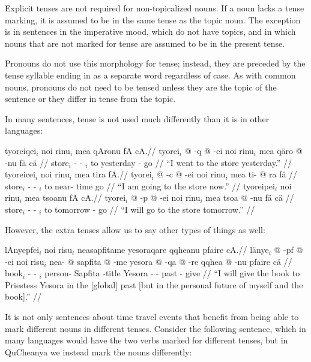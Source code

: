 \documentclass{article}
\begin{document}
Explicit tenses are not required for non-topicalized nouns.  If a noun lacks a tense marking, it is assumed to be in the same tense as the topic noun.  The exception is in sentences in the imperative mood, which do not have topics, and in which nouns that are not marked for tense are assumed to be in the present tense.

Pronouns do not use this morphology for tense; instead, they are preceded by the tense syllable ending in  as a separate word regardless of case. As with common nouns, pronouns do not need to be tensed unless they are the topic of the sentence or they differ in tense from the topic.

In many sentences, tense is not used much differently than it is in other languages:

\pex[lingstyle=QuCheanya] 
\a
\begingl
\glpreamble tyoreiqei$_i$ noi rinu$_i$ mea qAronu fA cA.//
\gla tyorei$_i$ @ -q @ -ei noi rinu$_i$ mea q\"aro @ -nu f\"a c\"a //
\glb store$_i$ - -  $_i$ to yesterday - go  //
\glft ``I went to the store yesterday.'' //
\endgl
\a
\begingl
\glpreamble tyoreicei$_i$ noi rinu$_i$ mea tira fA.//
\gla tyorei$_i$ @ -c @ -ei noi rinu$_i$ mea ti- @ ra f\"a //
\glb store$_i$ - -  $_i$ to near- time go //
\glft ``I am going to the store now.'' //
\endgl
\a
\begingl
\glpreamble tyoreipei$_i$ noi rinu$_i$ mea tsoanu fA cA.//
\gla tyorei$_i$ @ -p @ -ei noi rinu$_i$ mea tsoa @ -nu f\"a c\"a //
\glb store$_i$ - -  $_i$ to tomorrow - go  //
\glft ``I will go to the store tomorrow.'' //
\endgl
\xe

However, the extra tenses allow us to say other types of things as well:

\ex[lingstyle=QuCheanya] \begingl
\glpreamble lAnyepfei$_i$ noi risu$_i$ neasapfitame yesoraqare qqheanu pfaire cA.//
\gla l\"anye$_i$ @ -pf @ -ei noi risu$_i$ nea- @ sapfita @ -me yesora @ -qa @ -re qqhea @ -nu pfaire c\"a //
\glb book$_i$ - -  $_i$ person- Sapfita -title Yesora - - past - give  //
\glft ``I will give the book to Priestess Yesora in the [global] past [but in the personal future of myself and the book].'' //
\endgl \xe

It is not only sentences about time travel events that benefit from being able to mark different nouns in different tenses. Consider the following sentence, which in many languages would have the two verbs marked for different tenses, but in QuCheanya we instead mark the nouns differently:
\end{document}
